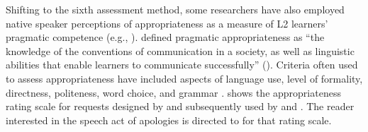 \documentclass[output=paper]{langscibook}
\begin{document}
Shifting to the sixth assessment method, some researchers have also employed native speaker perceptions of appropriateness as a measure of L2 learners’ pragmatic competence (e.g., \citealt{Halenko2018,Hernández2016,Hernández2018a,Hernándezinpress,HernándezBoero2018a,Li2014,ShivelyCohen2008,Taguchi2011}). \citet{Taguchi2006} defined pragmatic appropriateness as “the knowledge of the conventions of communication in a society, as well as linguistic abilities that enable learners to communicate successfully” (\citeyear[513]{Taguchi2006}). Criteria often used to assess appropriateness have included aspects of language use, level of formality, directness, politeness, word choice, and grammar \citep{Taguchi2011}.  shows the appropriateness rating scale for requests designed by \citet{ShivelyCohen2008} and subsequently used by \citet{Hernández2016,Hernández2018a} and \citet{HernándezBoero2018a}. The reader interested in the speech act of apologies is directed to \citet{ShivelyCohen2008} for that rating scale.

\begin{table}
	\caption{ pragmatic appropriateness rating scale for requests}
	\label{tab:4:2}
\end{table}
\end{document}
